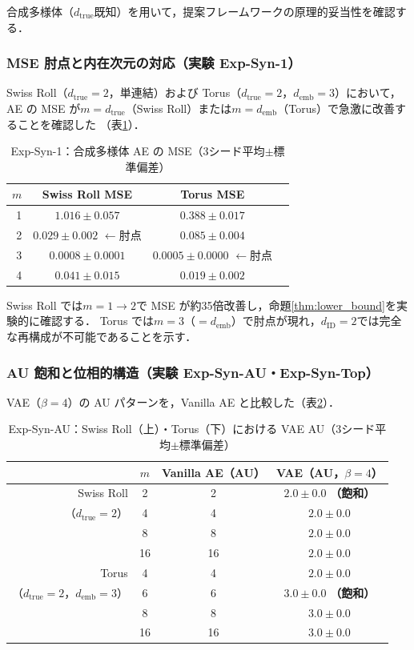 \documentclass[11pt,a4paper]{jsarticle}
\newcommand{\dID}{d_{\mathrm{ID}}}
\newcommand{\dtrue}{d_{\mathrm{true}}}
\newcommand{\demb}{d_{\mathrm{emb}}}
\begin{document}
合成多様体（$\dtrue$既知）を用いて，提案フレームワークの原理的妥当性を確認する．

\subsubsection{MSE 肘点と内在次元の対応（実験 Exp-Syn-1）}

Swiss Roll（$\dtrue = 2$，単連結）および Torus（$\dtrue = 2$，$\demb = 3$）において，
AE の MSE が$m = \dtrue$（Swiss Roll）または$m = \demb$（Torus）で急激に改善することを確認した
（表\ref{tab:e1}）．

\begin{table}[H]
\centering
\caption{Exp-Syn-1：合成多様体 AE の MSE（3シード平均$\pm$標準偏差）}
\label{tab:e1}
\small
\begin{tabular}{rccc}
\toprule
$m$ & Swiss Roll MSE & Torus MSE \\
\midrule
1 & $1.016\pm0.057$ & $0.388\pm0.017$ \\
2 & $\boldsymbol{0.029\pm0.002}$ $\leftarrow$肘点 & $0.085\pm0.004$ \\
3 & $0.0008\pm0.0001$ & $\boldsymbol{0.0005\pm0.0000}$ $\leftarrow$肘点 \\
4 & $0.041\pm0.015$ & $0.019\pm0.002$ \\
\bottomrule
\end{tabular}
\end{table}

Swiss Roll では$m = 1 \to 2$で MSE が約35倍改善し，命題\ref{thm:lower_bound}を実験的に確認する．
Torus では$m = 3$（$= \demb$）で肘点が現れ，$\dID = 2$では完全な再構成が不可能であることを示す．

\subsubsection{AU 飽和と位相的構造（実験 Exp-Syn-AU・Exp-Syn-Top）}

VAE（$\beta = 4$）の AU パターンを，Vanilla AE と比較した（表\ref{tab:ea_summary}）．

\begin{table}[H]
\centering
\caption{Exp-Syn-AU：Swiss Roll（上）・Torus（下）における VAE AU（3シード平均$\pm$標準偏差）}
\label{tab:ea_summary}
\small
\begin{tabular}{rccc}
\toprule
 & $m$ & Vanilla AE（AU） & VAE（AU，$\beta=4$） \\
\midrule
Swiss Roll & 2 & 2 & $2.0\pm0.0$ \textbf{（飽和）} \\
（$\dtrue = 2$） & 4 & 4 & $2.0\pm0.0$ \\
 & 8 & 8 & $2.0\pm0.0$ \\
 & 16 & 16 & $2.0\pm0.0$ \\
\midrule
Torus & 4 & 4 & $2.0\pm0.0$ \\
（$\dtrue = 2$，$\demb = 3$） & 6 & 6 & $3.0\pm0.0$ \textbf{（飽和）} \\
 & 8 & 8 & $3.0\pm0.0$ \\
 & 16 & 16 & $3.0\pm0.0$ \\
\bottomrule
\end{tabular}
\end{table}
\end{document}
